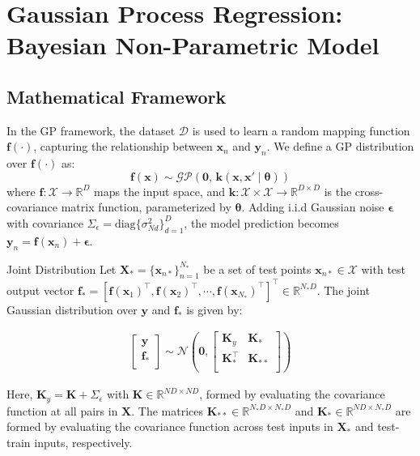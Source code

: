 \section[Gaussian Process Regression]{Gaussian Process Regression: Bayesian Non-Parametric Model}
\subsection{Mathematical Framework}
\begin{frame}
	In the GP framework, the dataset $\mathcal{D}$ is used to learn a random mapping function $\bm{f}(\cdot)$, capturing the relationship between $\bm{x}_n$ and $\bm{y}_n$. We define a GP distribution over $\bm{f}(\cdot)$ as:
	\begin{equation}\label{mogp_notation}
	\bm{f}(\bm{x}) \sim  \mathcal{GP}\left(\bm{0},\, \bm{k}(\bm{x}, \bm{x}' \mid \bm{\theta})\right)
	\end{equation}
	where $\bm{f}: \mathcal{X} \rightarrow \mathbb{R}^D$ maps the input space, and $\bm{k}: \mathcal{X} \times \mathcal{X} \rightarrow \mathbb{R}^{D \times D}$ is the cross-covariance matrix function, parameterized by $\bm{\theta}$. Adding i.i.d Gaussian noise $\bm{\epsilon}$ with covariance $\Sigma_\epsilon = \text{diag}\{\sigma^2_{Nd}\}_{d=1}^D$, the model prediction becomes $\bm{y}_n = \bm{f}(\bm{x}_n) + \bm{\epsilon}$.
\end{frame}

\begin{frame}{Joint Distribution}
	Let $\mathbf{X}_* = \{\bm{x}_{n*}\}_{n=1}^{N_*}$ be a set of test points $\bm{x}_{n*} \in \mathcal{X}$ with test output vector $\mathbf{f}_* = [\bm{f}(\bm{x}_1)^\top, \bm{f}(\bm{x}_2)^\top, \cdots, \bm{f}(\bm{x}_{N_*})^\top]^\top \in \mathbb{R}^{N_* D}$. The joint Gaussian distribution over $\mathbf{y}$ and $\mathbf{f}_*$ is given by:
	
	\begin{equation}\label{sogp_prior_matrix}
	\begin{array}{rcl}
	\left[ \begin{array}{c}
	\mathbf{y}\\
	\mathbf{f_*}\\
	\end{array}
	\right]
	\sim
	\mathcal{N} \left(
	\bm{0},
	\left[ \begin{array}{cc}
	\mathbf{K}_y & \mathbf{K}_*\\
	\mathbf{K}_*^\top & \mathbf{K}_{**}\\
	\end{array}
	\right] \right)
	\end{array}
	\end{equation}
	
	Here, $\mathbf{K}_y=\mathbf{K} + \Sigma_\epsilon$ with $\mathbf{K} \in \mathbb{R}^{ND \times ND}$, formed by evaluating the covariance function at all pairs in $\mathbf{X}$. The matrices $\mathbf{K}_{**} \in \mathbb{R}^{N_*D \times N_*D}$ and $\mathbf{K}_{*} \in \mathbb{R}^{ND \times N_*D}$ are formed by evaluating the covariance function across test inputs in $\mathbf{X}_*$ and test-train inputs, respectively.
\end{frame}

